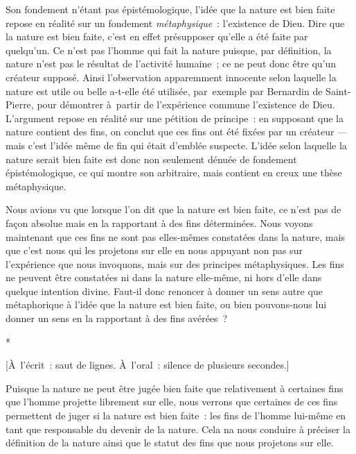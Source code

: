 \documentclass[a4paper,12pt]{article}
\begin{document}
Son fondement n'étant pas épistémologique, l'idée
que la nature est bien faite repose en réalité sur un fondement
\emph{métaphysique}​ : l'existence de Dieu. Dire que la nature est bien faite,
c'est en effet présupposer qu'elle a été faite par quelqu'un. Ce n'est
pas l'homme qui fait la nature puisque, par définition, la nature n'est
pas le résultat de l'activité humaine ; ce ne peut donc être qu'un
créateur supposé. Ainsi l'observation apparemment
innocente selon laquelle la nature est utile ou belle a-t-elle été
utilisée, par exemple par Bernardin de Saint-Pierre, pour démontrer
à partir de l'expérience commune l'existence de Dieu. L'argument repose
en réalité sur une pétition de principe : en supposant que la nature
contient des fins, on conclut que ces fins ont été fixées par un
créateur — mais c'est l'idée même de fin qui était d'emblée suspecte.
L'idée selon laquelle la nature serait bien
faite est donc non seulement dénuée de fondement épistémologique, ce qui
montre son arbitraire, mais contient en creux une thèse métaphysique.

Nous avions vu que lorsque l'on dit que
la nature est bien faite, ce n'est pas de façon absolue mais en la
rapportant à des fins déterminées. Nous voyons maintenant que ces fins
ne sont pas elles-mêmes constatées dans la nature, mais que c'est nous
qui les projetons sur elle en nous appuyant non pas sur l'expérience que
nous invoquons, mais sur des principes métaphysiques. Les fins ne
peuvent être constatées ni dans la nature elle-même, ni hors d'elle dans
quelque intention divine. Faut-il donc renoncer à
donner un sens autre que métaphorique à l'idée que la nature est bien
faite, ou bien pouvons-nous lui donner un sens en la rapportant à des
fins avérées ?

\begin{center}
*

[À l'écrit : saut de lignes. À l'oral : silence de plusieurs secondes.]
\end{center}

Puisque la nature ne peut être jugée bien faite
que relativement à certaines fins que l'homme projette librement sur
elle, nous verrons que certaines de ces fins permettent de juger si la
nature est bien faite : les fins de l'homme lui-même en tant que
responsable du devenir de la nature. Cela na nous conduire à préciser la
définition de la nature ainsi que le statut des fins que nous projetons
sur elle.
\end{document}
